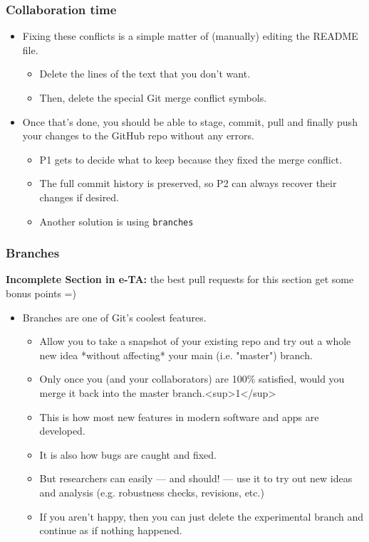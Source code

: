 \documentclass[
  shownotes,
  xcolor={svgnames},
  hyperref={colorlinks,citecolor=DarkBlue,linkcolor=DarkRed,urlcolor=DarkBlue}
  ]{beamer}
\begin{document}
\begin{frame}[fragile]
\frametitle{Collaboration time}
\begin{itemize}
  \item Fixing these conflicts is a simple matter of (manually) editing the README file.
  \begin{itemize}
    \item  Delete the lines of the text that you don't want.
    \item  Then, delete the special Git merge conflict symbols.  
  \end{itemize}
  \bigskip
  \item Once that's done, you should be able to stage, commit, pull and finally push your changes to the GitHub repo without any errors.
  \begin{itemize}
    \item P1 gets to decide what to keep because they fixed the merge conflict.
    \item The full commit history is preserved, so P2 can always recover their changes if desired.
    \item Another solution is using \texttt{branches}
  \end{itemize}
\end{itemize}




\end{frame}

\begin{frame}[fragile]
\frametitle{Branches}

\textbf{Incomplete Section in e-TA:} the best pull requests for this section get
some bonus points =)
\begin{itemize}
  \item Branches are one of Git's coolest features.
  \begin{itemize}
    \item Allow you to take a snapshot of your existing repo and try out a whole new idea *without affecting* your main (i.e. "master") branch.
    \item Only once you (and your collaborators) are 100\% satisfied, would you merge it back into the master branch.<sup>1</sup>
    \item This is how most new features in modern software and apps are developed.
    \item It is also how bugs are caught and fixed.
    \item But researchers can easily — and should! — use it to try out new ideas and analysis (e.g. robustness checks, revisions, etc.)
    \item If you aren't happy, then you can just delete the experimental branch and continue as if nothing happened.  
  \end{itemize}


\end{itemize}


\end{frame}
\end{document}

